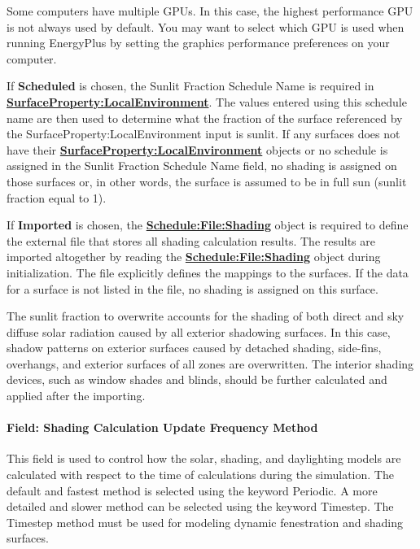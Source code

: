 Some computers have multiple GPUs. In this case, the highest performance GPU is not always used by default. You may want to select which GPU is used when running EnergyPlus by setting the graphics performance preferences on your computer.

If \textbf{Scheduled} is chosen, the Sunlit Fraction Schedule Name is required in \textbf{\hyperref[surfacePropertylocalEnvironment]{SurfaceProperty:LocalEnvironment}}. The values entered using this schedule name are then used to determine what the fraction of the surface referenced by the SurfaceProperty:LocalEnvironment input is sunlit. If any surfaces does not have their \textbf{\hyperref[surfacePropertylocalEnvironment]{SurfaceProperty:LocalEnvironment}} objects or no schedule is assigned in the Sunlit Fraction Schedule Name field, no shading is assigned on those surfaces or, in other words, the surface is assumed to be in full sun (sunlit fraction equal to 1).

If \textbf{Imported} is chosen, the \textbf{\hyperref[schedulefileshading]{Schedule:File:Shading}} object is required to define the external file that stores all shading calculation results. The results are imported altogether by reading the \textbf{\hyperref[schedulefileshading]{Schedule:File:Shading}} object during initialization. The file explicitly defines the mappings to the surfaces. If the data for a surface is not listed in the file, no shading is assigned on this surface.

The sunlit fraction to overwrite accounts for the shading of both direct and sky diffuse solar radiation caused by all exterior shadowing surfaces. In this case, shadow patterns on exterior surfaces caused by detached shading, side-fins, overhangs, and exterior surfaces of all zones are overwritten. The interior shading devices, such as window shades and blinds, should be further calculated and applied after the importing.

\paragraph{Field: Shading Calculation Update Frequency Method}\label{field-calculation-method-000}

This field is used to control how the solar, shading, and daylighting models are calculated with respect to the time of calculations during the simulation. The default and fastest method is selected using the keyword Periodic. A more detailed and slower method can be selected using the keyword Timestep. The Timestep method must be used for modeling dynamic fenestration and shading surfaces.

